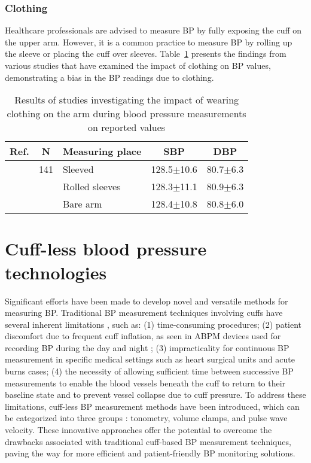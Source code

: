 \documentclass[journal,article,moreauthors]{Definitions/mdpi}
\begin{document}
\subsubsection{Clothing}
Healthcare professionals are advised to measure BP by fully exposing the cuff on the upper arm. However, it is a common practice to measure BP by rolling up the sleeve or placing the cuff over sleeves. Table~\ref{Tab: Clothing} presents the findings from various studies that have examined the impact of clothing on BP values, demonstrating a bias in the BP readings due to clothing. 
\begin{table}[tb]
\caption{Results of studies investigating the impact of wearing clothing on the arm during blood pressure measurements on reported values}\label{Tab: Clothing}
\begin{center}
\begin{tabular}{rclcc}
\toprule
\textbf{Ref.} & \textbf{N}  &\textbf{Measuring place} & \textbf{SBP} & \textbf{DBP} \\
\hline
\citep{Ki2013-ai} & 141 & Sleeved & 128.5$\pm$10.6 & 80.7$\pm$6.3 \\
& & Rolled sleeves & 128.3$\pm$11.1 & 80.9$\pm$6.3 \\
& & Bare arm & 128.4$\pm$10.8 & 80.8$\pm$6.0 
\\
\bottomrule
\end{tabular}
\end{center}
\end{table}

\section{Cuff-less blood pressure technologies}
Significant efforts have been made to develop novel and versatile methods for measuring BP. Traditional BP measurement techniques involving cuffs have several inherent limitations \citep{peter2014review}, such as: (1) time-consuming procedures; (2) patient discomfort due to frequent cuff inflation, as seen in ABPM devices used for recording BP during the day and night \citep{Pickering2008}; (3) impracticality for continuous BP measurement in specific medical settings such as heart surgical units and acute burns cases; (4) the necessity of allowing sufficient time between successive BP measurements to enable the blood vessels beneath the cuff to return to their baseline state and to prevent vessel collapse due to cuff pressure. To address these limitations, cuff-less BP measurement methods have been introduced, which can be categorized into three groups \citep{mousavi2018designing, Sharma2017-ng, rastegar2020non}: tonometry, volume clamps, and pulse wave velocity. These innovative approaches offer the potential to overcome the drawbacks associated with traditional cuff-based BP measurement techniques, paving the way for more efficient and patient-friendly BP monitoring solutions.
\end{document}
